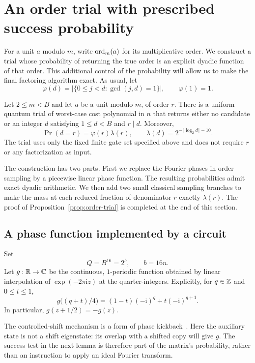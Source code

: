 \section{An order trial with prescribed success probability}
\label{sec:order}

For a unit $a$ modulo $m$, write $\operatorname{ord}_m(a)$ for its multiplicative order.
We construct a trial whose probability of returning the true order is an
explicit dyadic function of that order.  This additional control of the
probability will allow us to make the final factoring algorithm exact.
As usual, let
\[
 \varphi(d)=\bigl|\{0\le j<d:\gcd(j,d)=1\}\bigr|,
 \qquad \varphi(1)=1.
\]

\begin{proposition}\label{prop:order-trial}
Let $2\le m<B$ and let $a$ be a unit modulo $m$, of order $r$.
There is a uniform quantum trial of worst-case cost polynomial in $n$
that returns either no candidate or an integer $d$ satisfying
$1\le d<B$ and $r\mid d$.  Moreover,
\[
 \Pr(d=r)=\varphi(r)\lambda(r),
 \qquad
 \lambda(d)=2^{-\lceil\log_2 d\rceil-10}.
\]
The trial uses only the fixed finite gate set specified above and does not
require $r$ or any factorization as input.
\end{proposition}

The construction has two parts.  First we replace the Fourier phases in
order sampling by a piecewise linear phase function.  The resulting
probabilities admit exact dyadic arithmetic.  We then add two small
classical sampling branches to make the mass at each reduced fraction of
denominator $r$ exactly $\lambda(r)$.  The proof of
Proposition~\ref{prop:order-trial} is completed at the end of this section.

\subsection{A phase function implemented by a circuit}

Set
\[
 Q=B^{16}=2^b,\qquad b=16n.
\]
Let $g:\mathbb R\to\mathbb C$ be the continuous, $1$-periodic function obtained by
linear interpolation of $\exp(-2\pi\mathrm i z)$ at the quarter-integers.
Explicitly, for $q\in\mathbb Z$ and $0\le t\le1$,
\begin{equation}\label{eq:linear-phase}
 g\bigl((q+t)/4\bigr)
   =(1-t)(-\mathrm i)^q+t(-\mathrm i)^{q+1}.
\end{equation}
In particular, $g(z+1/2)=-g(z)$.

The controlled-shift mechanism is a form of phase kickback~\cite[Section~7]{CEMM}.
Here the auxiliary state is not a shift eigenstate: its overlap with a
shifted copy will give $g$. The success test in the next lemma is therefore
part of the matrix's probability, rather than an instruction to apply an
ideal Fourier transform.


